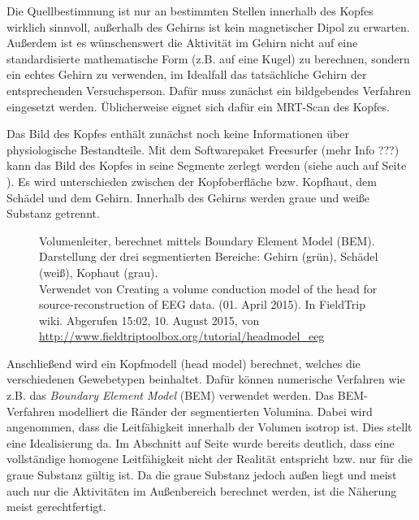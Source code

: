 \documentclass[doc,a4paper,12pt]{apa6}
\makeatletter
\DeclareRobustCommand*{\nameref}[1]{%
      \glqq{\myorg@nameref{#1}}\grqq%
    }%
\makeatother
\begin{document}
Die Quellbestimmung ist nur an bestimmten Stellen innerhalb des Kopfes wirklich sinnvoll, außerhalb des Gehirns ist kein magnetischer Dipol zu erwarten. Außerdem ist es wünschenswert die Aktivität im Gehirn nicht auf eine standardisierte mathematische Form (z.B. auf eine Kugel) zu berechnen, sondern ein echtes Gehirn zu verwenden, im Idealfall das tatsächliche Gehirn der entsprechenden Versuchsperson. Dafür muss zunächst ein bildgebendes Verfahren eingesetzt werden. Üblicherweise eignet sich dafür ein MRT-Scan des Kopfes.

Das Bild des Kopfes enthält zunächst noch keine Informationen über physiologische Bestandteile. Mit dem Softwarepaket Freesurfer (mehr Info ???) kann das Bild des Kopfes in seine Segmente zerlegt werden (siehe auch \nameref{sec:head-struct} auf Seite \pageref{sec:head-struct}). Es wird unterschieden zwischen der Kopfoberfläche bzw. Kopfhaut, dem Schädel und dem Gehirn. Innerhalb des Gehirns werden graue und weiße Substanz getrennt.

\begin{figure}[t]
  \centering
  \vspace*{3mm}
  \caption[Volumenleiter, berechnet mittels Boundary Element Model (BEM)]{Volumenleiter, berechnet mittels Boundary Element Model (BEM). Darstellung der drei segmentierten Bereiche: Gehirn (grün), Schädel (weiß), Kophaut (grau).\\ Verwendet von \glqq Creating a volume conduction model of the head for source-reconstruction of EEG data\grqq . (01. April 2015). In FieldTrip wiki. Abgerufen 15:02, 10. August 2015, von \url{http://www.fieldtriptoolbox.org/tutorial/headmodel_eeg}}
  \label{img:bem}
\end{figure}

Anschließend wird ein Kopfmodell (head model) berechnet, welches die verschiedenen Gewebetypen beinhaltet. Dafür können numerische Verfahren wie z.B. das \emph{Boundary Element Model} (BEM) verwendet werden. Das BEM-Verfahren modelliert die Ränder der segmentierten Volumina. Dabei wird angenommen, dass die Leitfähigkeit innerhalb der Volumen isotrop ist. Dies stellt eine Idealisierung da. Im Abschnitt \nameref{sec:head-struct} auf Seite \pageref{sec:head-struct} wurde bereits deutlich, dass eine vollständige homogene Leitfähigkeit nicht der Realität entspricht bzw. nur für die graue Substanz gültig ist. Da die graue Substanz jedoch außen liegt und meist auch nur die Aktivitäten im Außenbereich berechnet werden, ist die Näherung meist gerechtfertigt.
\end{document}
